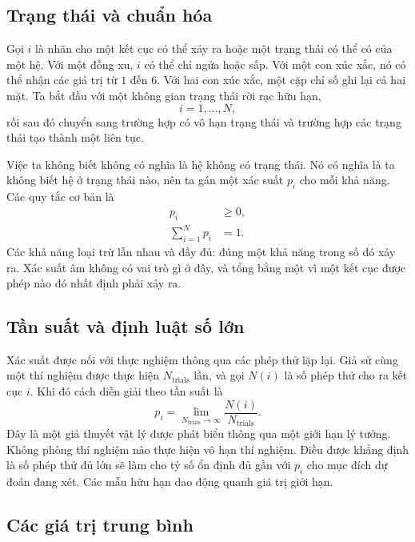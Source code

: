 \subsection{Trạng thái và chuẩn hóa}

Gọi \(i\) là nhãn cho một kết cục có thể xảy ra hoặc một trạng thái có thể có của một hệ. Với một đồng xu, \(i\) có thể chỉ ngửa hoặc sấp. Với một con xúc xắc, nó có thể nhận các giá trị từ \(1\) đến \(6\). Với hai con xúc xắc, một cặp chỉ số ghi lại cả hai mặt. Ta bắt đầu với một không gian trạng thái rời rạc hữu hạn,
\begin{equation}
 i=1,\ldots,N,
\end{equation}
rồi sau đó chuyển sang trường hợp có vô hạn trạng thái và trường hợp các trạng thái tạo thành một liên tục.

Việc ta không biết không có nghĩa là hệ không có trạng thái. Nó có nghĩa là ta không biết hệ ở trạng thái nào, nên ta gán một xác suất \(p_i\) cho mỗi khả năng. Các quy tắc cơ bản là
\begin{align}
 p_i &\geq 0, \label{eq:sm1-prob-positive}\\
 \sum_{i=1}^{N}p_i &=1. \label{eq:sm1-prob-normalization}
\end{align}
Các khả năng loại trừ lẫn nhau và đầy đủ: đúng một khả năng trong số đó xảy ra. Xác suất âm không có vai trò gì ở đây, và tổng bằng một vì một kết cục được phép nào đó nhất định phải xảy ra.

\subsection{Tần suất và định luật số lớn}

Xác suất được nối với thực nghiệm thông qua các phép thử lặp lại. Giả sử cùng một thí nghiệm được thực hiện \(N_{\mathrm{trials}}\) lần, và gọi \(N(i)\) là số phép thử cho ra kết cục \(i\). Khi đó cách diễn giải theo tần suất là
\begin{equation}
 p_i=
 \lim_{N_{\mathrm{trials}}\to\infty}
 \frac{N(i)}{N_{\mathrm{trials}}}.
 \label{eq:sm1-frequency}
\end{equation}
Đây là một giả thuyết vật lý được phát biểu thông qua một giới hạn lý tưởng. Không phòng thí nghiệm nào thực hiện vô hạn thí nghiệm. Điều được khẳng định là số phép thử đủ lớn sẽ làm cho tỷ số ổn định đủ gần với \(p_i\) cho mục đích dự đoán đang xét. Các mẫu hữu hạn dao động quanh giá trị giới hạn.

\subsection{Các giá trị trung bình}

